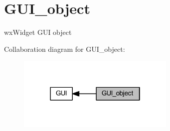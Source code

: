 \section{G\+U\+I\+\_\+object}
\label{group___g_u_i__object}


wx\+Widget G\+UI object  


Collaboration diagram for G\+U\+I\+\_\+object\+:\nopagebreak
\begin{figure}[H]
\begin{center}
\leavevmode
\includegraphics[width=214pt]{group___g_u_i__object}
\end{center}
\end{figure}
